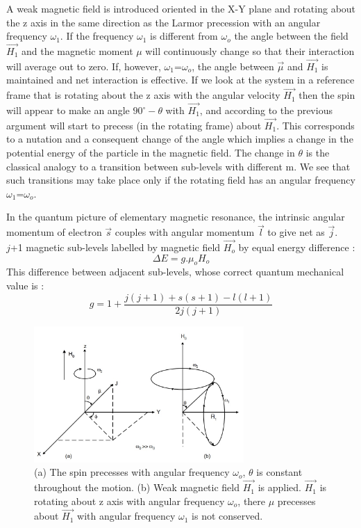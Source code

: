 \documentclass[a4paper, amsfonts, amssymb, amsmath, reprint, showkeys, nofootinbib, twoside]{revtex4-1}
\begin{document}
A weak magnetic field is introduced oriented in the X-Y plane and rotating about the z axis in the same direction as the Larmor precession with an angular
frequency $\omega_1$. If the frequency $\omega_1$ is different from $\omega_o$ the angle between the field $\vec{H_1}$ and the
magnetic moment $\mu$ will continuously change so that their interaction will average out to zero. If, however, $\omega_1$=$\omega_o$, the angle between $\vec{\mu}$ and $\vec{H_1}$ is maintained and net interaction is effective. If we look at the system in a reference frame that is rotating about the z axis with the
angular velocity $\vec{H_1}$ then the spin will appear to make an angle $90^{\circ}-\theta$ with $\vec{H_1}$, and according to the previous argument will start to precess (in the rotating frame) about $\vec{H_1}$. This corresponds to a nutation and a consequent change of the angle which implies a change in the potential energy of the particle in the magnetic field. The change in $\theta$ is the classical analogy to a transition between sub-levels with different m. We see that such transitions may take place only if the rotating field has an angular frequency $\omega_1$=$\omega_o$. 

In the quantum picture of elementary magnetic resonance, the intrinsic angular momentum of electron $\vec{s}$ couples with angular momentum $\vec{l}$ to give net as $\vec{j}$. \\$j$+1 magnetic sub-levels labelled by magnetic field $\vec{H_o}$ by equal energy difference :
\begin{equation}\label{e2}
\Delta E=g.\mu_o H_o
\end{equation}
This difference between adjacent sub-levels, whose correct quantum mechanical value is :
\begin{equation}
g=1+\frac{j(j+1)+s(s+1)-l(l+1)}{2j(j+1)}
\end{equation}

\begin{figure}[htbp] %
   \centering
   \includegraphics[width=8cm]{7} 
   \caption{(a) The spin precesses with angular frequency $\omega_o$, $\theta$ is constant throughout the motion. \newline (b) Weak magnetic field $\vec{H_1}$ is applied. $\vec{H_1}$ is rotating about z axis with angular frequency $\omega_o$, there $\mu$ precesses about $\vec{H_1}$ with angular frequency $\omega_1$ is not conserved.}
   \label{lp}
\end{figure}
\end{document}
